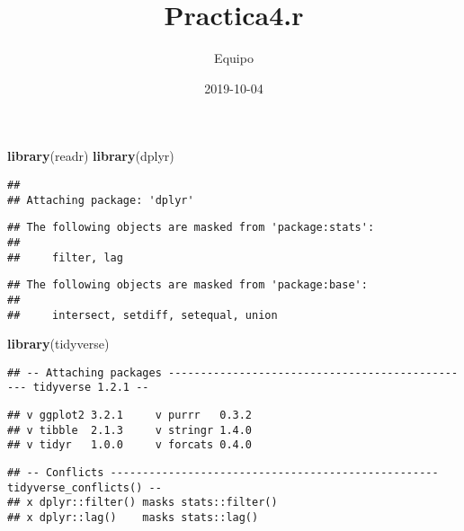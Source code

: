 \documentclass[]{article}
\title{Practica4.r}
\author{Equipo}
\date{2019-10-04}
\newenvironment{Shaded}{\begin{snugshade}}{\end{snugshade}}
\newcommand{\CommentTok}[1]{\textcolor[rgb]{0.56,0.35,0.01}{\textit{#1}}}
\newcommand{\KeywordTok}[1]{\textcolor[rgb]{0.13,0.29,0.53}{\textbf{#1}}}
\newcommand{\NormalTok}[1]{#1}
\newcommand{\StringTok}[1]{\textcolor[rgb]{0.31,0.60,0.02}{#1}}
\begin{document}
\maketitle

\begin{Shaded}
\begin{Highlighting}[]
\KeywordTok{library}\NormalTok{(readr)}
\KeywordTok{library}\NormalTok{(dplyr)}
\end{Highlighting}
\end{Shaded}

\begin{verbatim}
## 
## Attaching package: 'dplyr'
\end{verbatim}

\begin{verbatim}
## The following objects are masked from 'package:stats':
## 
##     filter, lag
\end{verbatim}

\begin{verbatim}
## The following objects are masked from 'package:base':
## 
##     intersect, setdiff, setequal, union
\end{verbatim}

\begin{Shaded}
\begin{Highlighting}[]
\KeywordTok{library}\NormalTok{(tidyverse)}
\end{Highlighting}
\end{Shaded}

\begin{verbatim}
## -- Attaching packages ------------------------------------------------ tidyverse 1.2.1 --
\end{verbatim}

\begin{verbatim}
## v ggplot2 3.2.1     v purrr   0.3.2
## v tibble  2.1.3     v stringr 1.4.0
## v tidyr   1.0.0     v forcats 0.4.0
\end{verbatim}

\begin{verbatim}
## -- Conflicts --------------------------------------------------- tidyverse_conflicts() --
## x dplyr::filter() masks stats::filter()
## x dplyr::lag()    masks stats::lag()
\end{verbatim}

\begin{Shaded}
\end{Shaded}
\end{document}
